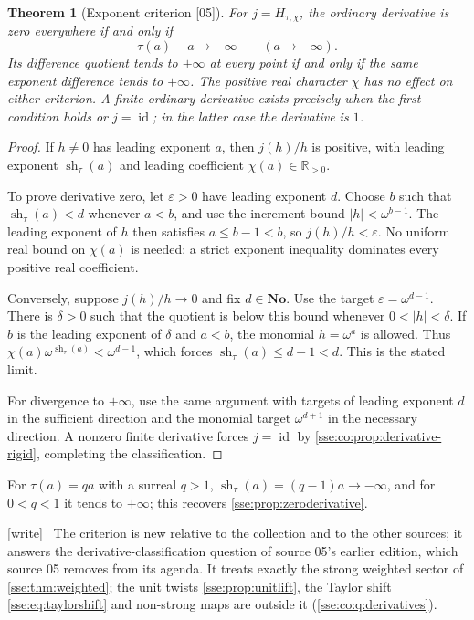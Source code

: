 \documentclass[11pt,a4paper]{article}
\numberwithin{equation}{section}
\theoremstyle{plain}
\newtheorem{theorem}{Theorem}[section]
\theoremstyle{definition}
\theoremstyle{remark}
\newcommand{\No}{\mathbf{No}}
\newcommand{\R}{\mathbb{R}}
\newcommand{\id}{\operatorname{id}}
\newcommand{\src}[1]{\textup{\textsf{\small[#1]}}}%
\newcommand{\wtag}{\textup{\textsf{[write]}}}%
\newenvironment{wnote}{\par\smallskip\noindent\wtag\ }{\par\smallskip}
\newcommand{\shco}{\operatorname{sh}}%
\begin{document}
\begin{theorem}[Exponent criterion \src{05}]\label{sse:co:thm:derivative-criterion}
For $j=H_{\tau,\chi}$, the ordinary derivative is zero everywhere if and only
if
\[
 \tau(a)-a\longrightarrow-\infty\qquad(a\longrightarrow-\infty).
\]
Its difference quotient tends to $+\infty$ at every point if and only if the
same exponent difference tends to $+\infty$. The positive real character
$\chi$ has no effect on either criterion. A finite ordinary derivative exists
precisely when the first condition holds or $j=\id$; in the latter case the
derivative is $1$.
\end{theorem}
\begin{proof}
If $h\ne0$ has leading exponent $a$, then $j(h)/h$ is positive, with leading
exponent $\shco_\tau(a)$ and leading coefficient $\chi(a)\in\R_{>0}$.

To prove derivative zero, let $\varepsilon>0$ have leading exponent $d$.
Choose $b$ such that $\shco_\tau(a)<d$ whenever $a<b$, and use the increment
bound $|h|<\omega^{b-1}$. The leading exponent of $h$ then satisfies
$a\le b-1<b$, so $j(h)/h<\varepsilon$. No uniform real bound on $\chi(a)$ is
needed: a strict exponent inequality dominates every positive real
coefficient.

Conversely, suppose $j(h)/h\to0$ and fix $d\in\No$. Use the target
$\varepsilon=\omega^{d-1}$. There is $\delta>0$ such that the quotient is
below this bound whenever $0<|h|<\delta$. If $b$ is the leading exponent of
$\delta$ and $a<b$, the monomial $h=\omega^a$ is allowed. Thus
$\chi(a)\omega^{\shco_\tau(a)}<\omega^{d-1}$, which forces
$\shco_\tau(a)\le d-1<d$. This is the stated limit.

For divergence to $+\infty$, use the same argument with targets of leading
exponent $d$ in the sufficient direction and the monomial target
$\omega^{d+1}$ in the necessary direction. A nonzero finite derivative forces
$j=\id$ by \cref{sse:co:prop:derivative-rigid}, completing the
classification.
\end{proof}
For $\tau(a)=qa$ with a surreal $q>1$, $\shco_\tau(a)=(q-1)a\to-\infty$, and
for $0<q<1$ it tends to $+\infty$; this recovers \cref{sse:prop:zeroderivative}.
\begin{wnote}
The criterion is new relative to the collection and to the other sources;
it answers the derivative-classification question of source 05's earlier
edition, which source 05 removes from its agenda. It treats exactly the
strong weighted sector of \cref{sse:thm:weighted}; the unit twists
\cref{sse:prop:unitlift}, the Taylor shift \eqref{sse:eq:taylorshift} and
non-strong maps are outside it (\cref{sse:co:q:derivatives}).
\end{wnote}
\end{document}
